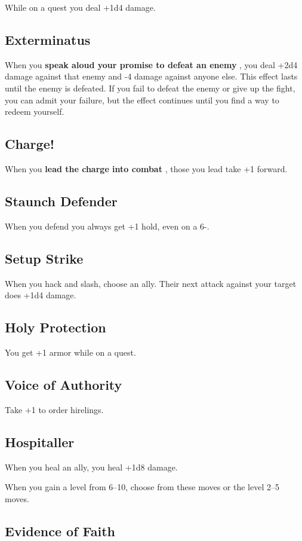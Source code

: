  While on a quest you deal +1d4 damage.
\subsection{Exterminatus}


 When you \textbf{speak aloud your promise to defeat an enemy}
, you deal +2d4 damage against that enemy and -4 damage against anyone else. This effect lasts until the enemy is defeated. If you fail to defeat the enemy or give up the fight, you can admit your failure, but the effect continues until you find a way to redeem yourself.
\subsection{Charge!}


 When you \textbf{lead the charge into combat}
, those you lead take +1 forward.
\subsection{Staunch Defender}


 When you defend you always get +1 hold, even on a 6-.
\subsection{Setup Strike}


 When you hack and slash, choose an ally. Their next attack against your target does +1d4 damage.
\subsection{Holy Protection}


 You get +1 armor while on a quest.
\subsection{Voice of Authority}


 Take +1 to order hirelings.
\subsection{Hospitaller}


 When you heal an ally, you heal +1d8 damage.


\vspace{\baselineskip}
{\Large When you gain a level from 6--10, choose from these moves or the level 2--5 moves.}
\subsection{Evidence of Faith}


